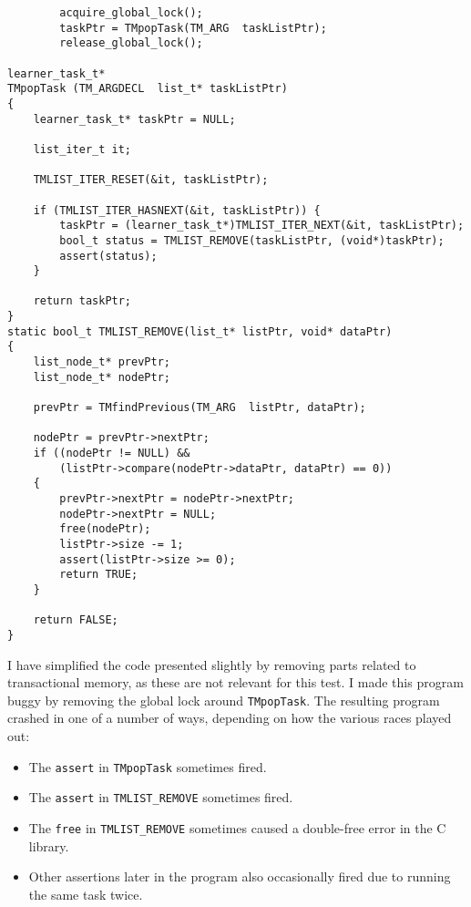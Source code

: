 \begin{verbatim}
        acquire_global_lock();
        taskPtr = TMpopTask(TM_ARG  taskListPtr);
        release_global_lock();

learner_task_t*
TMpopTask (TM_ARGDECL  list_t* taskListPtr)
{
    learner_task_t* taskPtr = NULL;

    list_iter_t it;

    TMLIST_ITER_RESET(&it, taskListPtr);

    if (TMLIST_ITER_HASNEXT(&it, taskListPtr)) {
        taskPtr = (learner_task_t*)TMLIST_ITER_NEXT(&it, taskListPtr);
        bool_t status = TMLIST_REMOVE(taskListPtr, (void*)taskPtr);
        assert(status);
    }

    return taskPtr;
}
static bool_t TMLIST_REMOVE(list_t* listPtr, void* dataPtr)
{
    list_node_t* prevPtr;
    list_node_t* nodePtr;

    prevPtr = TMfindPrevious(TM_ARG  listPtr, dataPtr);

    nodePtr = prevPtr->nextPtr;
    if ((nodePtr != NULL) &&
        (listPtr->compare(nodePtr->dataPtr, dataPtr) == 0))
    {
        prevPtr->nextPtr = nodePtr->nextPtr;
        nodePtr->nextPtr = NULL;
        free(nodePtr);
        listPtr->size -= 1;
        assert(listPtr->size >= 0);
        return TRUE;
    }

    return FALSE;
}
\end{verbatim}

I have simplified the code presented slightly by removing parts
related to transactional memory, as these are not relevant for this
test.  I made this program buggy by removing the global lock around
\verb|TMpopTask|.  The resulting program crashed in one of a number of
ways, depending on how the various races played out:

\begin{itemize}
\item The \verb|assert| in \verb|TMpopTask| sometimes fired.
\item The \verb|assert| in \verb|TMLIST_REMOVE| sometimes fired.
\item The \verb|free| in \verb|TMLIST_REMOVE| sometimes caused a
  double-free error in the C library.
\item Other assertions later in the program also occasionally fired
  due to running the same task twice.
\end{itemize}

